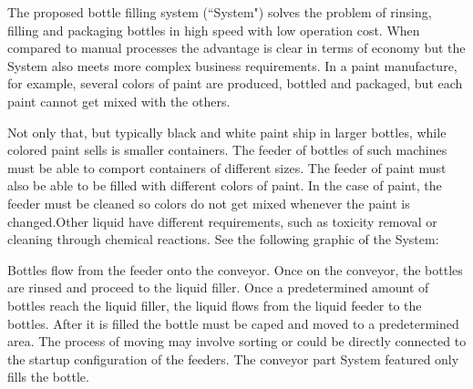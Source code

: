 The proposed bottle filling system (``System") solves the problem of rinsing, filling and packaging bottles in high speed with low operation cost. When compared to manual processes the advantage is clear in terms of economy but the System also meets more complex business requirements. In a paint manufacture, for example, several colors of paint are produced, bottled and packaged, but each paint cannot get mixed with the others.

Not only that, but typically black and white paint ship in larger bottles, while colored paint sells is smaller containers. The feeder of bottles of such machines must be able to comport containers of different sizes. The feeder of paint must also be able to be filled with different colors of paint. In the case of paint, the feeder must be cleaned so colors do not get mixed whenever the paint is changed.Other liquid have different requirements, such as toxicity removal or cleaning through chemical reactions. See the following graphic of the System:

Bottles flow from the feeder onto the conveyor. Once on the conveyor, the bottles are rinsed and proceed to the liquid filler. Once a predetermined amount of bottles reach the liquid filler, the liquid flows from the liquid feeder to the bottles. After it is filled the bottle must be caped and moved to a predetermined area. The process of moving may involve sorting or could be directly connected to the startup configuration of the feeders. The conveyor part System featured only fills the bottle. 








